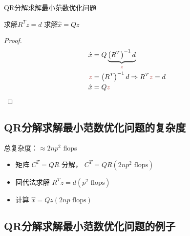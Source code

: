 \begin{algorithm}[htbp]
    \caption{QR分解求解最小范数优化问题}
    求解$R^T z=d$ \;
    求解$\hat{x} = Qz$\;
    
\end{algorithm}

\begin{proof}
    \begin{equation}\displaystyle \begin{aligned}
    \hat{x} & =Q\underbrace{\left( R^{T}\right)^{-1} d}_{\textcolor[rgb]{0.72,0.33,0.31}{z}}\\
    \textcolor[rgb]{0.72,0.33,0.31}{z} & =\left( R^{T}\right)^{-1} d\Rightarrow R^{T}\textcolor[rgb]{0.72,0.33,0.31}{z} =d\\
    \hat{x} & =Q\textcolor[rgb]{0.72,0.33,0.31}{z}
    \end{aligned}\end{equation}
\end{proof}


\subsection{QR分解求解最小范数优化问题的复杂度}

总复杂度：$ \approx 2 n p^{2} $ flops

\begin{itemize}
    \item 矩阵 $ C^{T}=Q R $ 分解， $ C^{T}=Q R\left(2 n p^{2}  \text{ flops}\right) $
    \item 回代法求解 $ R^{T} z=d\left(p^{2} \text{ flops} \right) $
    \item 计算 $ \hat{x}=Q z(2 n p \text{ flops} ) $
\end{itemize}



\subsection{QR分解求解最小范数优化问题的例子}

